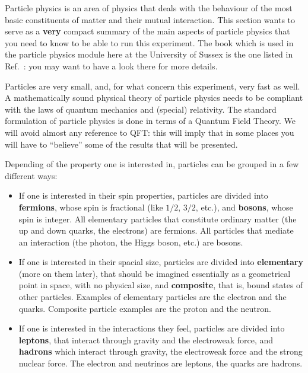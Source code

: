 

Particle physics is an area of physics that deals with the behaviour of the most basic constituents of matter and their mutual interaction. This section wants to serve as a \textbf{very} compact summary of the main aspects of particle physics that you need to know to be able to run this experiment. The book which is used in the particle physics module here at the University of Sussex is the one listed in Ref.~\cite{shaw}: you may want to have a look there for more details. 

Particles are very small, and, for what concern this experiment, very fast as well. A mathematically sound physical theory of particle physics needs to be compliant with the laws of quantum mechanics and (special) relativity. The standard formulation of particle physics is done in terms of a Quantum Field Theory. We will avoid almost any reference to QFT: this will imply that in some places you will have to ``believe'' some of the results that will be presented. 

Depending of the property one is interested in, particles can be grouped in a few different ways:

\begin{itemize}
\item If one is interested in their spin properties, particles are divided into \textbf{fermions}, whose spin is fractional (like $1/2$, $3/2$, etc.), and \textbf{bosons}, whose spin is integer. All elementary particles that constitute ordinary matter (the up and down quarks, the electrons) are fermions. All particles that mediate an interaction (the photon, the Higgs boson, etc.) are bosons.
\item If one is interested in their spacial size, particles are divided into \textbf{elementary} (more on them later), that should be imagined essentially as a geometrical point in space, with no physical size, and \textbf{composite}, that is, bound states of other particles. Examples of elementary particles are the electron and the quarks. Composite particle examples are the proton and the neutron. 
\item If one is interested in the interactions they feel, particles are divided into \textbf{leptons}, that interact through gravity and the electroweak force, and \textbf{hadrons} which interact through gravity, the electroweak force and the strong nuclear force. The electron and neutrinos are leptons, the quarks are hadrons.
\end{itemize}

